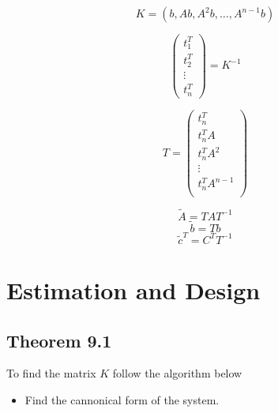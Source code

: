 \documentclass[12pt]{article}
\begin{document}
$$K=(b,Ab,A^2b,\dots,A^{n-1}b)$$

$$\begin{pmatrix}
	t_1^T\\
	t_2^T\\
	\vdots\\
	t_n^T
\end{pmatrix} = K^{-1}$$

$$T=\begin{pmatrix}
	t_n^T\\
	t_n^TA\\
	t_n^TA^2\\
	\vdots\\
	t_n^TA^{n-1}\\
\end{pmatrix}$$

$$\tilde{A}=TAT^{-1}$$
$$\tilde{b}=Tb$$
$$\tilde{c}^T=C^TT^{-1}$$

\section*{Estimation and Design}
\subsection*{Theorem 9.1}
To find the matrix $K$ follow the algorithm below
\begin{itemize}
	\item Find the cannonical form of the system. 
\end{itemize}
\end{document}

